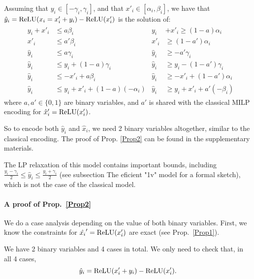 \newpage

\begin{proposition}
    \label{Prop2}
Assuming that $y_i \in [-\gamma_i, \gamma_i]$,
and that $x'_i \in [\alpha_i,\beta_i]$,
we have that $\hat{y}_i = \mathrm{ReLU}(x_i=x'_i+y_i)-\mathrm{ReLU}(x'_i)$ is the solution of:
	\begin{align*}
		& \begin{aligned}
			y_i + x'_i &\leq a\beta_i        &
			y_i &+ x'_i \geq (1-a)\alpha_i \\
			x'_i       &\leq a'\beta_i       & 
			x'_i       &\geq (1-a')\alpha_i \\
			\hat{y}_i  &\leq a\gamma_i       &
			\hat{y}_i  &\geq -a'\gamma_i \\
			\hat{y}_i  &\leq y_i + (1-a)\gamma_i  &
			\hat{y}_i  &\geq y_i - (1-a')\gamma_i \\
			\hat{y}_i  &\leq -x'_i + a\beta_i &
			\hat{y}_i  &\geq -x'_i + (1-a')\alpha_i \\
			\hat{y}_i  &\leq y_i + x'_i + (1-a)(-\alpha_i) &
			\hat{y}_i  &\geq y_i + x'_i + a'(-\beta_i)
		\end{aligned}
	\end{align*} 
    where $a,a' \in \{0,1\}$ are binary variables, 
    and $a'$ is shared with the classical MILP
    encoding for $\hat{x}'_i=\mathrm{ReLU}(x'_i)$.
\end{proposition}

So to encode both $\hat{y}_i$ and $\hat{x}_i$, we need 2 binary variables altogether, similar to the classical encoding. The proof of Prop. \ref{Prop2} can be found in the supplementary materials.


The LP relaxation of this model contains important bounds, including 
    $\frac{y_i-\gamma_i}{2} \leq \hat{y}_i \leq \frac{y_i+\gamma_i}{2}$
    (see subsection The eficient "1v" model for a formal sketch), which is not the case of the classical model.
	

	\iffalse
\paragraph{A proof of Prop.~\ref{Prop2}}

We do a case analysis depending on the value of both binary variables. 
First, we know the constraints for $\hat{x_i}'=\mathrm{ReLU}(x_i')$ are exact (see 
Prop.~\ref{Prop1}). 

We have 2 binary variables and 4 cases in total. We only need to check that, in all 4 cases, $$\hat{y}_i = \mathrm{ReLU}(x'_i+y_i)-\mathrm{ReLU}(x'_i).$$


